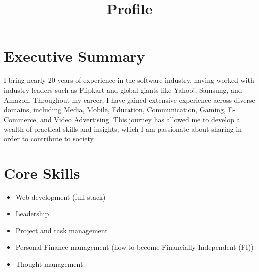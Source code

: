 \documentclass[11pt,a4paper,sans]{moderncv} %
\title{Profile}
\begin{document}
\makecvtitle %

\section{Executive Summary}
I bring nearly 20 years of experience in the software industry, having worked with industry leaders such as Flipkart and global giants like Yahoo!, Samsung, and Amazon. Throughout my career, I have gained extensive experience across diverse domains, including Media, Mobile, Education, Communication, Gaming, E-Commerce, and Video Advertising. This journey has allowed me to develop a wealth of practical skills and insights, which I am passionate about sharing in order to contribute to society.

\section{Core Skills}
  \begin{itemize}
    \item Web development (full stack)
    \item Leadership
    \item Project and task management
    \item Personal Finance management (how to become Financially Independent (FI))
    \item Thought management
  \end{itemize}

\end{document}
